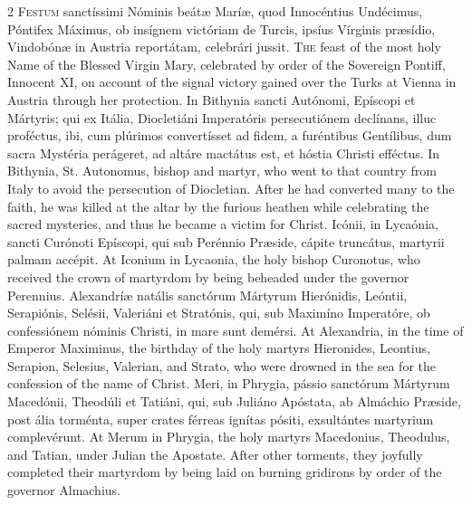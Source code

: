 \begin{paracol}{2}
\lettrine[lines=2]{F}{estum} sanctíssimi 
 Nóminis beátæ Maríæ, quod Innocéntius Undécimus, Póntifex Máximus, ob 
 insígnem victóriam de Turcis, ipsíus Vírginis præsídio, Vindobónæ in Austria 
 reportátam, celebrári jussit.
\switchcolumn
{}
\lettrine[lines=2]{T}{he} feast of the most holy Name of 
 the Blessed Virgin Mary, celebrated by order of the Sovereign Pontiff, 
 Innocent XI, on account of the signal victory gained over the Turks at 
 Vienna in Austria through her protection.
\switchcolumn*
{}
In Bithynia sancti 
 Autónomi, Epíscopi et Mártyris; qui ex Itália, Diocletiáni Imperatóris 
 persecutiónem declínans, illuc proféctus, ibi, cum plúrimos convertísset ad 
 fidem, a furéntibus Gentílibus, dum sacra Mystéria perágeret, ad altáre 
 mactátus est, et hóstia Christi efféctus.
\switchcolumn
{}
In Bithynia, St. Autonomus, bishop 
 and martyr, who went to that country from Italy to avoid the persecution of 
 Diocletian. After he had converted many to the faith, he was killed at 
 the altar by the furious heathen while celebrating the sacred mysteries, and 
 thus he became a victim for Christ.
\switchcolumn*
{}
Icónii, in Lycaónia, 
 sancti Curónoti Epíscopi, qui sub Perénnio Præside, cápite truncátus, 
 martyrii palmam accépit.
\switchcolumn
{}
At Iconium in Lycaonia, the holy 
 bishop Curonotus, who received the crown of martyrdom by being beheaded 
 under the governor Perennius.
\switchcolumn*
{}
Alexandríæ natális 
 sanctórum Mártyrum Hierónidis, Leóntii, Serapiónis, Selésii, Valeriáni et 
 Stratónis, qui, sub Maximíno Imperatóre, ob confessiónem nóminis Christi, in 
 mare sunt demérsi.
\switchcolumn
{}
At Alexandria, in the time of 
 Emperor Maximinus, the birthday of the holy martyrs Hieronides, Leontius, 
 Serapion, Selesius, Valerian, and Strato, who were drowned in the sea for 
 the confession of the name of Christ.
\switchcolumn*
{}
Meri, in Phrygia, 
 pássio sanctórum Mártyrum Macedónii, Theodúli et Tatiáni, qui, sub Juliáno Apóstata, ab Almáchio Præside, post ália torménta, super crates férreas 
 ignítas pósiti, exsultántes martyrium complevérunt.
\switchcolumn
{}
At Merum in Phrygia, the holy 
 martyrs Macedonius, Theodulus, and Tatian, under Julian the Apostate. 
 After other torments, they joyfully completed their martyrdom by being laid 
 on burning gridirons by order of the governor Almachius.

\end{paracol}
